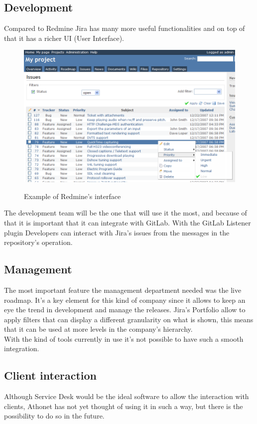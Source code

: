 	\subsection{Development} 
		Compared to Redmine Jira has many more useful functionalities and on top of that it has a richer UI (User Interface).
		\begin{figure}[H]
			\centering
			\includegraphics[width=\textwidth]{resources/redmine_screennn}\\
			\caption{Example of Redmine's interface}
		\end{figure}
		The development team will be the one that will use it the most, and because of that it is important that it can integrate with GitLab.
		With the GitLab Listener plugin\cite{gitlab-listener} Developers can interact with Jira's issues from the messages in the repository's operation.
	
	\subsection{Management} 
		The most important feature the management department needed was the live roadmap.	
		It's a key element for this kind of company since it allows to keep an eye the trend in development and manage the releases.
		Jira's Portfolio allow to apply filters that can display a different granularity on what is shown, this means that it can be used at more levels in the company's hierarchy.\\
		With the kind of tools currently in use it's not possible to have such a smooth integration.
	
	\subsection{Client interaction} 
		Although Service Desk would be the ideal software to allow the interaction with clients, Athonet has not yet thought of using it in such a way, but there is the possibility to do so in the future.
		
